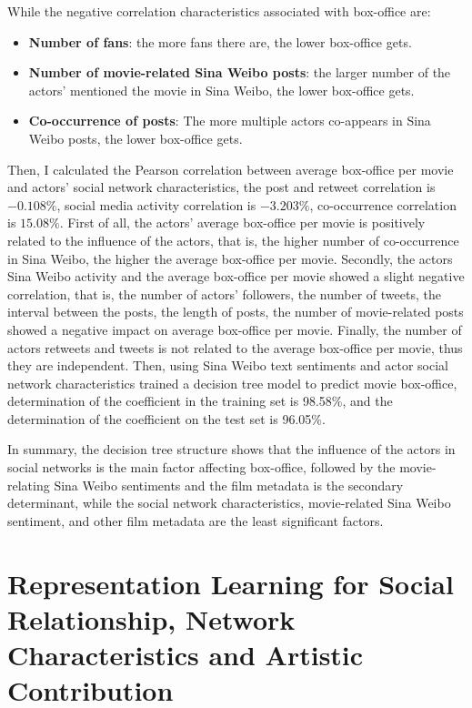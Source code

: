 \documentclass[review]{cvpr}
\begin{document}
While the negative correlation characteristics associated with box-office are:
\begin{itemize}
\item {\bf Number of fans}: the more fans there are, the lower box-office gets.
\item {\bf Number of movie-related Sina Weibo posts}: the larger number of the actors' mentioned the movie in Sina Weibo, the lower box-office gets.
\item {\bf Co-occurrence of posts}: The more multiple actors co-appears in Sina Weibo posts, the lower box-office gets.
\end{itemize}

\par Then, I calculated the Pearson correlation between average box-office per movie and actors' social network characteristics, the post and retweet correlation is $-0.108\%$, social media activity correlation is $-3.203\%$, co-occurrence correlation is $15.08\%$.
First of all, the actors' average box-office per movie is positively related to the influence of the actors, that is, the higher number of co-occurrence in Sina Weibo, the higher the average box-office per movie.
Secondly, the actors Sina Weibo activity and the average box-office per movie showed a slight negative correlation, that is,
the number of actors' followers, the number of tweets, the interval between the posts, the length of posts, the number of movie-related posts showed a negative impact on average box-office per movie.
Finally, the number of actors retweets and tweets is not related to the average box-office per movie, thus they are independent.
Then, using Sina Weibo text sentiments and actor social network characteristics trained a decision tree model to predict movie box-office,
determination of the coefficient in the training set is 98.58\%, and the determination of the coefficient on the test set is 96.05\%.

\par In summary, the decision tree structure shows that the influence of the actors in social networks is the main factor affecting box-office,
followed by the movie-relating Sina Weibo sentiments and the film metadata is the secondary determinant,
while the social network characteristics, movie-related Sina Weibo sentiment, and other film metadata are the least significant factors.

\section{Representation Learning for Social Relationship, Network Characteristics and Artistic Contribution}
\end{document}
